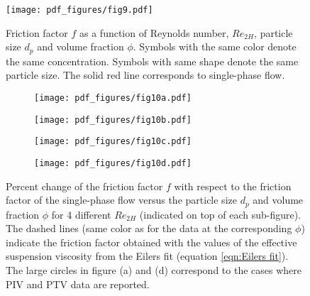 \documentclass{jfm}
\begin{document}
\begin{figure}
\centering
 \texttt{[image: pdf\_figures/fig9.pdf]}
\caption{Friction factor $f$ as a function of Reynolds number, $Re_{2H}$, particle size $d_p$ and volume fraction $\phi$. Symbols with the same color denote the same concentration. Symbols with same shape denote the same particle size. The solid red line corresponds to single-phase flow.}
\label{fig:f_vs_Re plot}
\end{figure}

\begin{figure}
\centering
\begin{subfigure}{.44\textwidth}
  \centering
  \texttt{[image: pdf\_figures/fig10a.pdf]}
  \caption{}
  \label{fig:df for Re10000}
\end{subfigure}%
\begin{subfigure}{.44\textwidth}
  \centering
  \texttt{[image: pdf\_figures/fig10b.pdf]}
  \caption{}
  \label{fig:df for Re15000}
\end{subfigure}
\begin{subfigure}{.44\textwidth}
  \centering
  \texttt{[image: pdf\_figures/fig10c.pdf]}
  \caption{}
  \label{fig:df for Re20000}
\end{subfigure}%
\begin{subfigure}{.44\textwidth}
  \centering
  \texttt{[image: pdf\_figures/fig10d.pdf]}
  \caption{}
  \label{fig:df for Re27000}
\end{subfigure}
\caption{Percent change of the friction factor $f$ with respect to the friction factor of the single-phase flow versus the particle size $d_p$ and volume  fraction $\phi$ for 4 different $Re_{2H}$ (indicated on top of each sub-figure). 
%
The dashed lines (same color as for the data at the corresponding $\phi$) indicate the friction factor obtained with the values of the effective suspension viscosity from the Eilers fit (equation \ref{eqn:Eilers fit}). 
The large circles in figure (a) and (d) correspond to the cases where PIV and PTV data are reported. 
}
\label{fig:df plot}
\end{figure}
\end{document}
